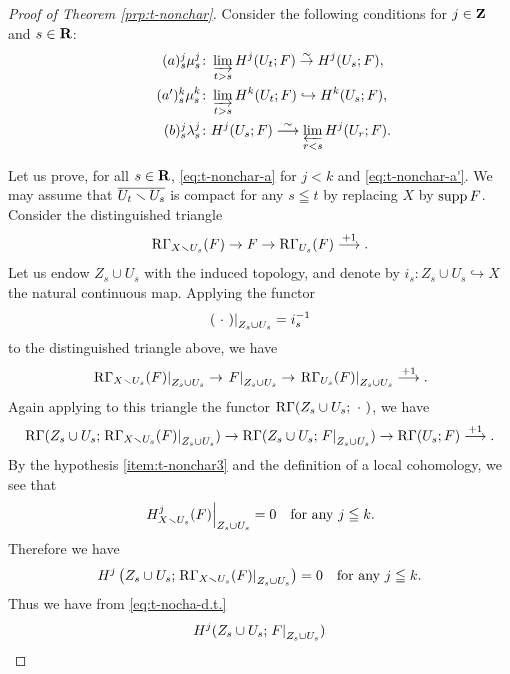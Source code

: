 \begin{proof}[{Proof of Theorem \ref{prp:t-nonchar}}]
  Consider the following conditions for 
  \(j\in\zz\) and \(s\in\rr\):
  \begin{align}
      \tag*{\((a)^j_s\)}\label{eq:t-nonchar-a}
      \mu_{s}^{j}&\colon
      \indlim[t>s] H^{j}(U_t;F) \simar H^{j}(U_s;F),\\
      \tag*{\((a')^k_s\)}\label{eq:t-nonchar-a'}
      \mu_{s}^{k}&\colon
      \indlim[t>s] H^{k}(U_t;F) \hookrightarrow H^{k}(U_s;F),\\
      \tag*{\((b)^j_s\)}\label{eq:t-nonchar-b}
      \lambda_{s}^{j}&\colon
      H^{j}(U_s;F)\simarr \prolim[r<s] H^{j}(U_r;F).
  \end{align}

  Let us prove, 
  for all \(s\in \rr\), 
  \ref{eq:t-nonchar-a} for \(j<k\) and \ref{eq:t-nonchar-a'}. 
  We may assume that \(\overline{U_{t}\smi U_{s}}\) is compact 
  for any \(s\leqq t\) by replacing \(X\) by \(\supp{F}\). 
  Consider the distinguished triangle\[
    \RG_{X\smi U_{s}}(F)
    \to
    F
    \to
    \RG_{U_{s}}(F)
    \overset{+1}{\longrightarrow}.
  \]
  Let us endow \(Z_{s}\cup U_{s}\) with the induced topology, and
  denote by \(
    i_{s}\colon Z_{s}\cup U_{s}\hookrightarrow X
  \) the natural continuous map.  
  Applying the functor \[
    \mres[(\blk)]{Z_{s}\cup U_{s}}=i_{s}^{-1}
  \] to the distinguished triangle above, we have \[
    \mres[\RG_{X\smi U_{s}}(F)]{Z_{s}\cup U_{s}}  
    \to
    \mres[F]{Z_{s}\cup U_{s}}  
    \to
    \mres[\RG_{U_{s}}(F)]{Z_{s}\cup U_{s}}  
    \overset{+1}{\longrightarrow}.
  \]
  Again applying to this triangle 
  the functor \(\RG(Z_{s}\cup U_{s};\blk)\), 
  we have
  \begin{equation}\label{eq:t-nocha-d.t.}
    \RG(Z_{s}\cup U_{s};\mres[\RG_{X\smi U_{s}}(F)]{Z_{s}\cup U_{s}})
    \to
    \RG(Z_{s}\cup U_{s};\mres[F]{Z_{s}\cup U_{s}})
    \to
    \RG(U_{s};F)
    \overset{+1}{\longrightarrow}. 
  \end{equation}
  By the hypothesis \eqref{item:t-nonchar3} and 
  the definition of a local cohomology, 
  we see that
  \[
    \mres[H^{j}_{X\smi U_{s}}(F)]{Z_{s}\cup U_{s}}=0
    \quad
    \text{for any \(j\leqq k\).}
  \]
  Therefore we have
  \[
    H^{j}\left(Z_{s}\cup U_{s};
      \mres[\RG_{X\smi U_{s}}(F)]{Z_{s}\cup U_{s}}
    \right)=0
    \quad
    \text{for any \(j\leqq k\).}
  \]
  Thus we have from \eqref{eq:t-nocha-d.t.}
  \begin{align}
    \label{eq:a-iso}
    H^{j}(Z_{s}\cup U_{s};\mres[F]{Z_{s}\cup U_{s}})

\end{align}
\end{proof}
